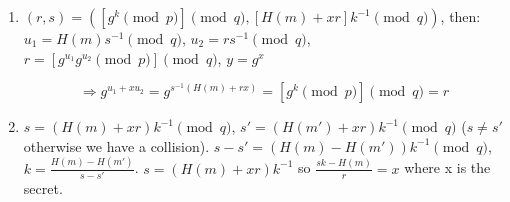\begin{solution}
  \begin{enumerate}
    \item
      $(r, s) = ([g^k \pmod{p}] \pmod{q}, [H(m) + xr]k^{-1} \pmod{q})$, then:
      $u_1 = H(m)s^{-1} \pmod{q}$,  $u_2 = rs^{-1} \pmod{q}$, $r = [g^{u_1} g^{u_2} \pmod{p}] \pmod{q}$, $y = g^x$

      $$\Rightarrow g^{u_1 + xu_2} = g^{s^{-1}(H(m) + rx)} = [g^k \pmod{p}] \pmod{q} = r$$
    \item
      $s = (H(m) + xr)k^{-1} \pmod{q}$, $s' = (H(m') + xr)k^{-1} \pmod{q}$ ($s \neq s'$ otherwise we have a collision).
      $s - s' = (H(m) - H(m'))k^{-1} \pmod{q}$, $k = \frac{H(m) - H(m')}{s - s'}$.
      $s = (H(m) + xr)k^{-1}$ so $\frac{sk - H(m)}{r} = x$ where x is the secret.
  \end{enumerate}
\end{solution}

\nosolution

